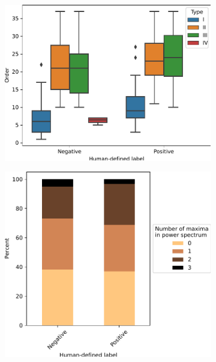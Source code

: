 \begin{figure}[hb!]
  \centering
  \begin{subfigure}[htpb]{0.4\textwidth}
   \centering
   \includegraphics[width=\textwidth]{ar_eval_1.pdf}
   \caption{
   }
   \label{fig:analysis-ar-order}
  \end{subfigure}%
  \begin{subfigure}[htpb]{0.4\textwidth}
   \centering
   \includegraphics[width=\textwidth]{ar_eval_2.pdf}
   \caption{
   }
   \label{fig:analysis-ar-maxima}
  \end{subfigure}


\end{figure}
